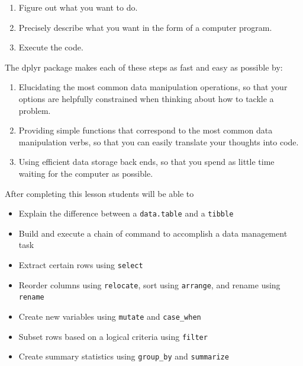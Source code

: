\documentclass[
  letterpaper,
  DIV=11,
  numbers=noendperiod,
  oneside]{scrreprt}
\providecommand{\tightlist}{%
  \setlength{\itemsep}{0pt}\setlength{\parskip}{0pt}}\usepackage{longtable,booktabs,array}
\begin{document}
\begin{enumerate}
\def\labelenumi{\arabic{enumi}.}
\tightlist
\item
  Figure out what you want to do.
\item
  Precisely describe what you want in the form of a computer program.
\item
  Execute the code.
\end{enumerate}

The dplyr package makes each of these steps as fast and easy as possible
by:

\begin{enumerate}
\def\labelenumi{\arabic{enumi}.}
\tightlist
\item
  Elucidating the most common data manipulation operations, so that your
  options are helpfully constrained when thinking about how to tackle a
  problem.
\item
  Providing simple functions that correspond to the most common data
  manipulation verbs, so that you can easily translate your thoughts
  into code.
\item
  Using efficient data storage back ends, so that you spend as little
  time waiting for the computer as possible.
\end{enumerate}

\begin{tcolorbox}[enhanced jigsaw, bottomrule=.15mm, colback=white, colframe=quarto-callout-note-color-frame, toprule=.15mm, coltitle=black, rightrule=.15mm, opacitybacktitle=0.6, colbacktitle=quarto-callout-note-color!10!white, toptitle=1mm, leftrule=.75mm, breakable, bottomtitle=1mm, titlerule=0mm, title={🎓 Learning Objectives}, arc=.35mm, left=2mm, opacityback=0]

After completing this lesson students will be able to

\begin{itemize}
\tightlist
\item
  Explain the difference between a \texttt{data.table} and a
  \texttt{tibble}
\item
  Build and execute a chain of command to accomplish a data management
  task
\item
  Extract certain rows using \texttt{select}
\item
  Reorder columns using \texttt{relocate}, sort using \texttt{arrange},
  and rename using \texttt{rename}
\item
  Create new variables using \texttt{mutate} and \texttt{case\_when}
\item
  Subset rows based on a logical criteria using \texttt{filter}
\item
  Create summary statistics using \texttt{group\_by} and
  \texttt{summarize}
\end{itemize}

\end{tcolorbox}
\end{document}
